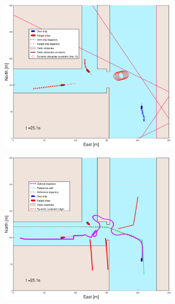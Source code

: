 \begin{figure}[!ht]
\begin{subfigure}[b]{0.499\textwidth}
    \end{subfigure}
    \hfill
    \\
    \begin{subfigure}[b]{0.49\textwidth}
        \centering
        \includegraphics[width=\textwidth]{Images/Figures/Havn1/_Simple_0fig1_time=25}
    \end{subfigure}
    \hfill
    \begin{subfigure}[b]{0.499\textwidth}
        \centering
        \includegraphics[width=\textwidth]{Images/Figures/Havn1/_Simple_0fig999_time=25}
    \end{subfigure}
    \hfill
\end{figure}%
